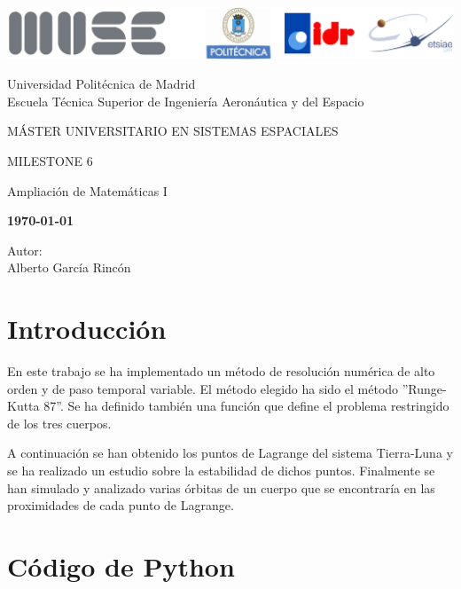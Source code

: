 \documentclass[12pt,a4paper]{article}
\begin{document}
	
\begin{titlepage}
	\centering
	\includegraphics[width=\textwidth]{FIGURES/Portada/Logo_portada.png} 
	\vspace{1.5cm}
	
	Universidad Politécnica de Madrid
	\\Escuela Técnica Superior de Ingeniería Aeronáutica y del Espacio
	\vspace{2cm}
	
	{\large MÁSTER UNIVERSITARIO EN SISTEMAS ESPACIALES}
	\vspace{2cm}
	
	{\LARGE MILESTONE 6}
	\vspace{1cm}
	
	{\large Ampliación de Matemáticas I}
	\vspace{4cm}
	
	\begin{center}
		\large{\textbf{\today}} \\
	\end{center}
	
	Autor: \\ Alberto García Rincón
	\vfill
\end{titlepage}

\newpage
\pagestyle{empty}
\tableofcontents	

\newpage
{}
\setcounter{page}{1}
\pagestyle{fancy} 

\section{Introducción} %
En este trabajo se ha implementado un método de resolución numérica de alto orden y de paso temporal variable. El método elegido ha sido el método ''Runge-Kutta 87''. Se ha definido también una función que define el problema restringido de los tres cuerpos. 

A continuación se han obtenido los puntos de Lagrange del sistema Tierra-Luna y se ha realizado un estudio sobre la estabilidad de dichos puntos. Finalmente se han simulado y analizado varias órbitas de un cuerpo que se encontraría en las proximidades de cada punto de Lagrange.


\section{Código de Python} %
\end{document}

